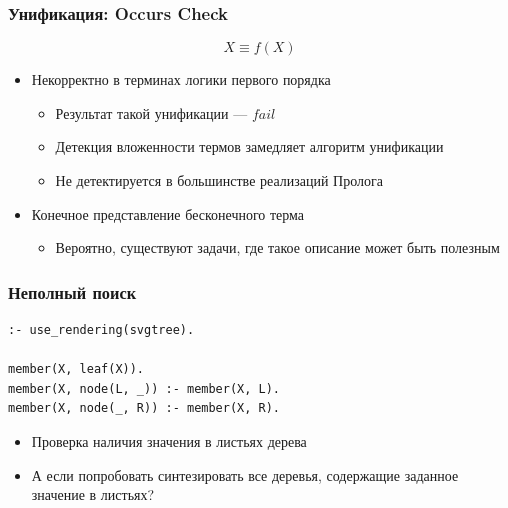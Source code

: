 \documentclass{../../slides-style}
\begin{document}
    \begin{frame}
        \frametitle{Унификация: Occurs Check}
    {\Large
    \[
    X \equiv f(X)
    \]}
    \pause
    \begin{itemize}
        \item Некорректно в терминах логики первого порядка
        \begin{itemize}
            \item Результат такой унификации --- $fail$
            \item Детекция вложенности термов замедляет алгоритм унификации
            \item Не детектируется в большинстве реализаций Пролога
        \end{itemize}
        \pause
        \vspace{2mm}
        \item Конечное представление бесконечного терма
        \begin{itemize}
            \item Вероятно, существуют задачи, где такое описание может быть полезным
        \end{itemize}
    \end{itemize}
    \end{frame}

    \begin{frame}[fragile]
        \frametitle{Неполный поиск}
        \begin{verbatim}
:- use_rendering(svgtree).

member(X, leaf(X)).
member(X, node(L, _)) :- member(X, L).
member(X, node(_, R)) :- member(X, R).
        \end{verbatim}
    \vspace{5mm}
    \begin{itemize}
        \item Проверка наличия значения в листьях дерева
        \pause
        \vspace{2mm}
        \item А если попробовать синтезировать все деревья, содержащие заданное значение в листьях?
    \end{itemize}
    \end{frame}
\end{document}
